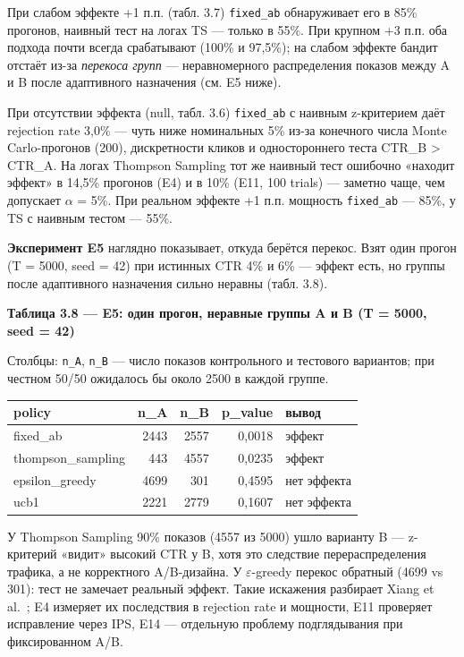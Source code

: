 При слабом эффекте +1 п.п. (табл. 3.7) \texttt{fixed\_ab} обнаруживает его в 85\% прогонов, наивный тест на логах TS --- только в 55\%. При крупном +3 п.п. оба подхода почти всегда срабатывают (100\% и 97,5\%); на слабом эффекте бандит отстаёт из-за \emph{перекоса групп} --- неравномерного распределения показов между A и B после адаптивного назначения (см. E5 ниже).

При отсутствии эффекта (null, табл. 3.6) \texttt{fixed\_ab} с наивным z-критерием даёт rejection rate 3,0\% --- чуть ниже номинальных 5\% из-за конечного числа Monte Carlo-прогонов (200), дискретности кликов и одностороннего теста CTR\_B \textgreater{} CTR\_A. На логах Thompson Sampling тот же наивный тест ошибочно «находит эффект» в 14,5\% прогонов (E4) и в 10\% (E11, 100 trials) --- заметно чаще, чем допускает $\alpha$ = 5\%. При реальном эффекте +1 п.п. мощность \texttt{fixed\_ab} --- 85\%, у TS с наивным тестом --- 55\%.

\textbf{Эксперимент E5} наглядно показывает, откуда берётся перекос. Взят один прогон (T = 5000, seed = 42) при истинных CTR 4\% и 6\% --- эффект есть, но группы после адаптивного назначения сильно неравны (табл. 3.8).

\textbf{Таблица 3.8 --- E5: один прогон, неравные группы A и B (T = 5000, seed = 42)}

Столбцы: \texttt{n\_A}, \texttt{n\_B} --- число показов контрольного и тестового вариантов; при честном 50/50 ожидалось бы около 2500 в каждой группе.

\begingroup\footnotesize\setlength{\tabcolsep}{4pt}
\begin{xltabular}{\linewidth}{@{}lrrrl@{}}
\toprule\noalign{}
policy & n\_A & n\_B & p\_value & вывод \\
\midrule\noalign{}
\endhead
\bottomrule\noalign{}
\endlastfoot
fixed\_ab & 2443 & 2557 & 0,0018 & эффект \\
thompson\_sampling & 443 & 4557 & 0,0235 & эффект \\
epsilon\_greedy & 4699 & 301 & 0,4595 & нет эффекта \\
ucb1 & 2221 & 2779 & 0,1607 & нет эффекта \\
\end{xltabular}
\endgroup

У Thompson Sampling 90\% показов (4557 из 5000) ушло варианту B --- z-критерий «видит» высокий CTR у B, хотя это следствие перераспределения трафика, а не корректного A/B-дизайна. У $\varepsilon$-greedy перекос обратный (4699 vs 301): тест не замечает реальный эффект. Такие искажения разбирает Xiang et al.~\cite{ref21}; E4 измеряет их последствия в rejection rate и мощности, E11 проверяет исправление через IPS, E14 --- отдельную проблему подглядывания при фиксированном A/B.

